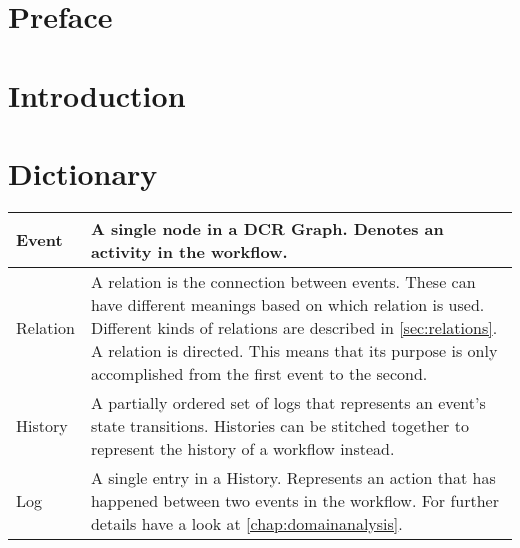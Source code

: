 \chapter{Preface}

\chapter{Introduction}

\chapter{Dictionary}
\begin{table}[H]
	\begin{tabularx}{\linewidth}{l X}
		Event & A single node in a DCR Graph. Denotes an activity in the workflow.\\\hline
		Relation & A relation is the connection between events. These can have different meanings based on which relation is used. Different kinds of relations are described in \autoref{sec:relations}. A relation is directed. This means that its purpose is only accomplished from the first event to the second.\todo[inline]{Skal det stå her?}\\\hline
		History & A partially ordered set of logs that represents an event's state transitions. Histories can be stitched together to represent the history of a workflow instead.\\\hline
		Log & A single entry in a History. Represents an action that has happened between two events in the workflow. For further details have a look at \autoref{chap:domainanalysis}.\\
	\end{tabularx}
\end{table}